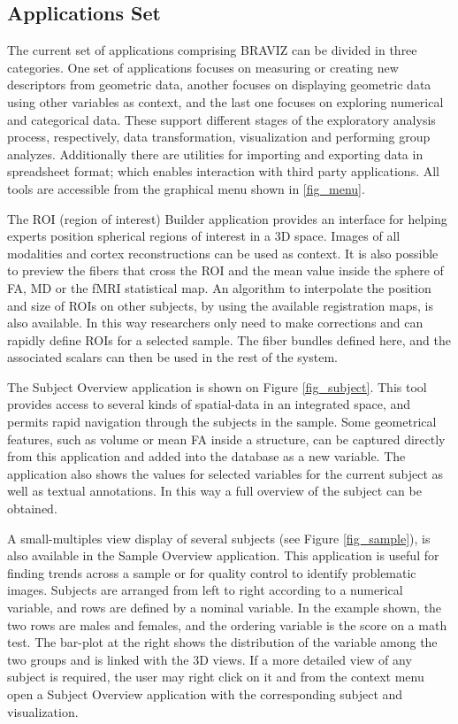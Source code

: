 \documentclass[utf8,paper]{frontiersSCNS} %
\begin{document}
\subsection{Applications Set}


The current set of applications comprising BRAVIZ can be divided in three categories. One set of applications focuses on measuring or creating new descriptors from geometric data, another focuses on displaying geometric data using other variables as context, and the last one focuses on exploring numerical and categorical data. These support different stages of the exploratory analysis process, respectively, data transformation, visualization and performing group analyzes. Additionally there are utilities for importing and exporting data in spreadsheet format; which enables interaction with third party applications. All tools are accessible from the graphical menu shown in \ref{fig_menu}. 

The ROI (region of interest) Builder application provides an interface for helping experts position spherical regions of interest in a 3D space. Images of all modalities and cortex reconstructions can be used as context. It is also possible to preview the fibers that cross the ROI and the mean value inside the sphere of FA, MD or the fMRI statistical map. An algorithm to interpolate the position and size of ROIs on other subjects, by using the available registration maps, is also available. In this way researchers only need to make corrections and can rapidly define ROIs for a selected sample. The fiber bundles defined here, and the associated scalars can then be used in the rest of the system.

The Subject Overview application is shown on Figure \ref{fig_subject}. This tool provides access to several kinds of spatial-data in an integrated space, and permits rapid navigation through the subjects in the sample. Some geometrical features, such as volume or mean FA inside a structure, can be captured directly from  this application and added into the database as a new variable. The application also shows the values for selected variables for the current subject as well as textual annotations. In this way a full overview of the subject can be obtained.

A small-multiples view \citep{tufte_visual_1983} display of several subjects (see Figure  \ref{fig_sample}), is also available in the Sample Overview application. This application is useful for finding trends across a sample or for quality control to identify problematic images. Subjects are arranged from left to right according to a numerical variable, and rows are defined by a nominal variable. In the example shown, the two rows are males and females, and the ordering variable is the score on a math test. The bar-plot at the right shows the distribution of the variable among the two groups and is linked with the 3D views. If a more detailed view of any subject is required, the user may right click on it and from the context menu open a Subject Overview application with the corresponding subject and visualization. 
\end{document}

